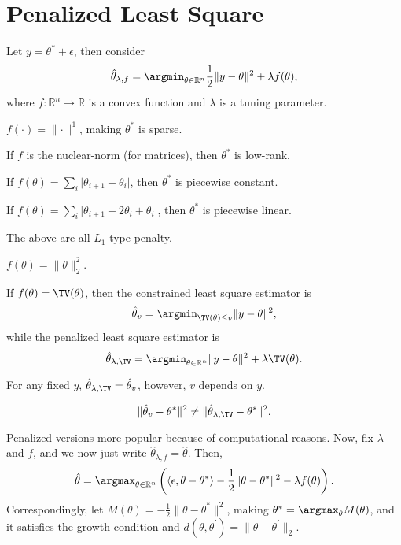 \section{Penalized Least Square}
Let \(y = \theta ^{\ast} + \epsilon \), then consider
\[
	\hat{\theta}_{\lambda , f} = \argmin_{\theta \in \mathbb{R} ^n} \frac{1}{2} \lVert y - \theta \rVert ^2 + \lambda f(\theta ),
\]
where \(f\colon \mathbb{R} ^n \to \mathbb{R} \) is a convex function and \(\lambda \) is a tuning parameter.

\begin{eg}[\(L_1\)-norm]
	\(f(\cdot) = \lVert \cdot \rVert ^1\), making \(\theta^{\ast} \) is sparse.
\end{eg}

\begin{eg}
	If \(f\) is the nuclear-norm (for matrices), then \(\theta^{\ast} \) is low-rank.
\end{eg}

\begin{eg}
	If \(f(\theta ) = \sum_{i} \vert \theta _{i+1} - \theta _i \vert \), then \(\theta ^{\ast} \) is piecewise constant.
\end{eg}

\begin{eg}
	If \(f(\theta ) = \sum_{i} \vert \theta _{i+1} - 2 \theta _i + \theta _i\vert \), then \(\theta ^{\ast} \) is piecewise linear.
\end{eg}

The above are all \(L_1\)-type penalty.

\begin{eg}
	\(f(\theta ) = \lVert \theta \rVert _2^2 \).
\end{eg}

If \(f(\theta ) = \TV(\theta ) \), then the constrained least square estimator is
\[
	\hat{\theta} _v = \argmin_{\TV(\theta ) \leq v} \lVert y - \theta \rVert ^2,
\]
while the penalized least square estimator is
\[
	\hat{\theta} _{\lambda , \TV} = \argmin_{\theta \in \mathbb{R} ^n} \lVert y - \theta  \rVert ^2 + \lambda \TV(\theta ) .
\]

For any fixed \(y\), \(\hat{\theta} _{\lambda , \TV } = \hat{\theta} _v\), however, \(v\) depends on \(y\).

\[
	\lVert \hat{\theta} _v - \theta ^{\ast}  \rVert ^2 \neq \lVert \hat{\theta} _{\lambda , \TV } - \theta ^{\ast} \rVert ^2.
\]

Penalized versions more popular because of computational reasons. Now, fix \(\lambda \) and \(f\), and we now just write \(\hat{\theta} _{\lambda , f} = \hat{\theta} \). Then,
\[
	\hat{\theta} = \argmax_{\theta \in \mathbb{R} ^n} \left( \langle \epsilon , \theta - \theta ^{\ast}  \rangle - \frac{1}{2} \lVert \theta - \theta ^{\ast}  \rVert ^2 - \lambda f(\theta )  \right) .
\]
Correspondingly, let \(M(\theta ) = -\frac{1}{2} \lVert \theta - \theta ^{\ast}  \rVert ^2 \), making \(\theta ^{\ast} = \argmax_{\theta } M(\theta )\), and it satisfies the \hyperref[def:growth-condition]{growth condition} and \(d(\theta , \theta ^{\prime} ) = \lVert \theta - \theta ^{\prime} \rVert _2 \).

